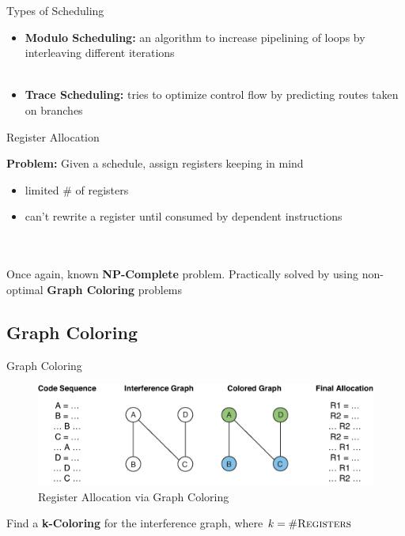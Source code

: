 \documentclass{beamer}
\begin{document}
\begin{darkframes}
\begin{frame}{Types of Scheduling}
\begin{itemize}
      \item {\bf \color{green} Modulo Scheduling:} an algorithm to increase pipelining of loops by interleaving different iterations \\
        \qquad \\

      \item {\bf \color{green} Trace Scheduling:} tries to optimize control flow by predicting routes taken on branches
      \end{itemize}
    \end{frame}

    \begin{frame}{Register Allocation}

	{\bf \alert{ Problem:}} Given a schedule, assign registers keeping in mind
	\begin{itemize}
		\item limited \# of registers
		\item can't rewrite a register until consumed by dependent instructions
	\end{itemize}
	\qquad \\
	\qquad \\
	Once again, known {\bf \color{green} NP-Complete} problem. Practically solved by using non-optimal {\bf \color{green} Graph Coloring} problems 
\end{frame}

\subsection{Graph Coloring}
\begin{frame}{Graph Coloring}
\begin{figure}
\includegraphics[scale=0.5]{figures/nshape}
\caption{Register Allocation via Graph Coloring}
\end{figure}
Find a {\bf \color{green} k-Coloring} for the interference graph, where {\bf \color{green} $k = \#\textsc{Registers}$}
\end{frame}


\end{darkframes}
\end{document}
